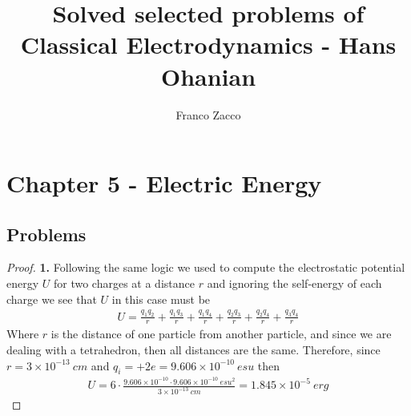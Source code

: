 \documentclass[11pt]{article}
\title{\textbf{Solved selected problems of Classical Electrodynamics - Hans Ohanian}}
\author{Franco Zacco}
\date{}
\theoremstyle{definition}
\begin{document}
\maketitle
\thispagestyle{empty}

\section*{Chapter 5 - Electric Energy}

\subsection*{Problems}
\begin{proof}{\textbf{1.}}
Following the same logic we used to compute the electrostatic potential energy
$U$ for two charges at a distance $r$ and ignoring the self-energy of each
charge we see that $U$ in this case must be
\begin{align*}
    U = \frac{q_1 q_2}{r} + \frac{q_1 q_3}{r} + \frac{q_1 q_4}{r} +
    \frac{q_2 q_3}{r} + \frac{q_2 q_4}{r} + \frac{q_3 q_4}{r}
\end{align*}
Where $r$ is the distance of one particle from another particle, and since we
are dealing with a tetrahedron, then all distances are the same.
Therefore, since $r = 3 \times 10^{-13} ~cm$ and
$q_i = +2e = 9.606\times 10^{-10}~esu$ then
\begin{align*}
    U = 6 \cdot \frac{9.606\times 10^{-10} \cdot 9.606\times 10^{-10}~esu^2}
    {3 \times 10^{-13} ~cm}
    = 1.845 \times 10^{-5} ~erg
\end{align*}
\end{proof}
\end{document}
